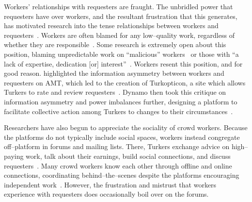 \documentclass[pn4226]{subfiles}
\begin{document}
Workers' relationships with requesters are fraught.
The unbridled power that requesters have over workers, and
the resultant frustration that this generates,
has motivated research into
the tense relationships between workers and requesters~\cite{fixingChaos,dynamo}.
Workers are often blamed for any low--quality work, regardless of whether they are responsible~\cite{martin2014being,takingAHITMcInnis}.
Some research is extremely open about this position, blaming unpredictable work on ``malicious'' workers~\cite{MaliciousCrowdworkersGadiraju} or those with ``a lack of expertise, dedication [or] interest''~\cite{Sheng:2008:GLI:1401890.1401965}.
Workers resent this position, and for good reason.
\citeauthor{turkopticon} highlighted the information asymmetry between workers and requesters on AMT,
which led to the creation of Turkopticon, a site which allows Turkers to rate and review requesters~\cite{turkopticon}.
Dynamo then took this critique on information asymmetry and power imbalances further, designing a platform to facilitate
collective action among Turkers to changes to their circumstances~\cite{dynamo}.


Researchers have also begun to appreciate the sociality of crowd workers.
Because the platforms do not typically include social spaces, workers instead congregate off--platform in forums and mailing lists.
There, Turkers exchange advice on high--paying work, talk about their earnings, build social connections, and discuss requesters~\cite{martin2014being}.
Many crowd workers know each other through offline and online connections, coordinating behind--the--scenes despite the platforms encouraging independent work~\cite{crowdcollab,yin2016communication}.
However, the frustration and mistrust that workers experience with requesters does occasionally boil over on the forums. 


\subsubsection{\pieceworkpers}

\begin{comment}
notes: what info do i assume the reader has seen already?
- Clark: pieceworkers work harder, more diligently, etc...
- Riis saw terrible conditions, documented and communicated it to the world
- Worker advocacy groups arose to speak out against piecework
\end{comment}
\end{document}
